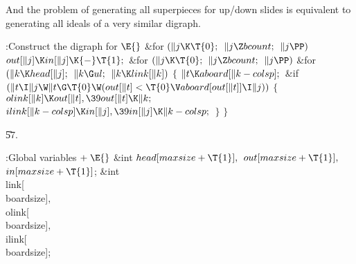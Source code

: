 And the problem of generating all superpieces for up/down slides
is equivalent to generating all ideals of a very similar digraph.

\Y\B\4:Construct the digraph for \X${}\E{}$\6
\&{for} ${}(\|j\K\T{0};{}$ ${}\|j\Z\\{bcount};{}$ ${}\|j\PP){}$\1\5
${}\\{out}[\|j]\K\\{in}[\|j]\K{-}\T{1};{}$\2\6
\&{for} ${}(\|j\K\T{0};{}$ ${}\|j\Z\\{bcount};{}$ ${}\|j\PP){}$\1\6
\&{for} ${}(\|k\K\\{head}[\|j];{}$ ${}\|k\G\\{ul};{}$ ${}\|k\K\\{link}[\|k]){}$%
\5
${}\{{}$\1\6
${}\|t\K\\{aboard}[\|k-\\{colsp}];{}$\6
\&{if} ${}(\|t\I\|j\W\|t\G\T{0}\W(\\{out}[\|t]<\T{0}\V\\{aboard}[\\{out}[\|t]]%
\I\|j)){}$\5
${}\{{}$\1\6
${}\\{olink}[\|k]\K\\{out}[\|t],\39\\{out}[\|t]\K\|k;{}$\6
${}\\{ilink}[\|k-\\{colsp}]\K\\{in}[\|j],\39\\{in}[\|j]\K\|k-\\{colsp};{}$\6
\4${}\}{}$\2\6
\4${}\}{}$\2\2\par
\U57.\fi

\B{}:Global variables\X${}\mathrel+\E{}$\6
\&{int} ${}\\{head}[\\{maxsize}+\T{1}],{}$ ${}\\{out}[\\{maxsize}+\T{1}],{}$
${}\\{in}[\\{maxsize}+\T{1}]{}$;\6
\&{int} \\{link}[\\{boardsize}]${},{}$ \\{olink}[\\{boardsize}]${},{}$ %
\\{ilink}[\\{boardsize}];\par
\fi

